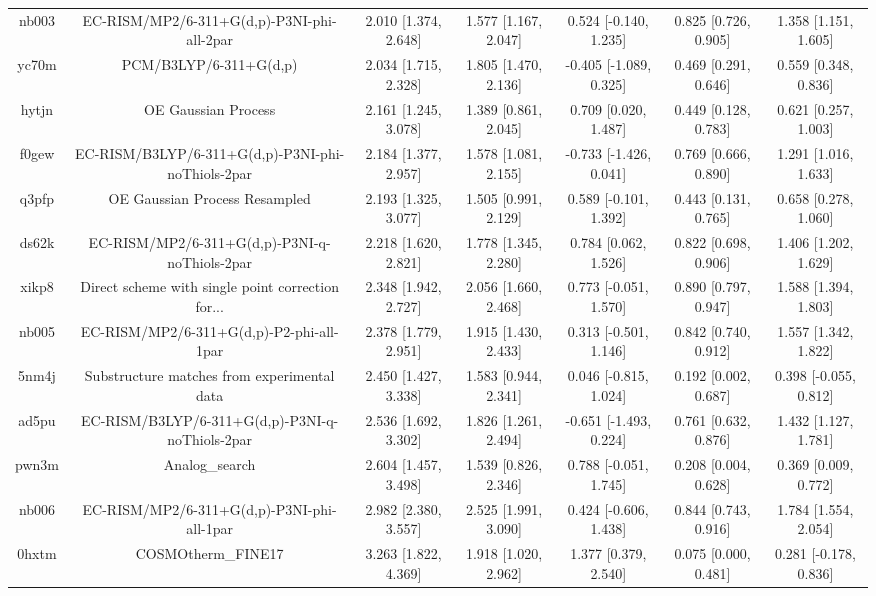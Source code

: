 \documentclass{article}
\begin{document}
\begin{center}
\begin{longtable}{|ccccccc|}
 nb003 &         EC-RISM/MP2/6-311+G(d,p)-P3NI-phi-all-2par &  2.010 [1.374, 2.648] &  1.577 [1.167, 2.047] &    0.524 [-0.140, 1.235] &  0.825 [0.726, 0.905] &   1.358 [1.151, 1.605] \\
 yc70m &                             PCM/B3LYP/6-311+G(d,p) &  2.034 [1.715, 2.328] &  1.805 [1.470, 2.136] &   -0.405 [-1.089, 0.325] &  0.469 [0.291, 0.646] &   0.559 [0.348, 0.836] \\
 hytjn &                                OE Gaussian Process &  2.161 [1.245, 3.078] &  1.389 [0.861, 2.045] &     0.709 [0.020, 1.487] &  0.449 [0.128, 0.783] &   0.621 [0.257, 1.003] \\
 f0gew &  EC-RISM/B3LYP/6-311+G(d,p)-P3NI-phi-noThiols-2par &  2.184 [1.377, 2.957] &  1.578 [1.081, 2.155] &   -0.733 [-1.426, 0.041] &  0.769 [0.666, 0.890] &   1.291 [1.016, 1.633] \\
 q3pfp &                      OE Gaussian Process Resampled &  2.193 [1.325, 3.077] &  1.505 [0.991, 2.129] &    0.589 [-0.101, 1.392] &  0.443 [0.131, 0.765] &   0.658 [0.278, 1.060] \\
 ds62k &      EC-RISM/MP2/6-311+G(d,p)-P3NI-q-noThiols-2par &  2.218 [1.620, 2.821] &  1.778 [1.345, 2.280] &     0.784 [0.062, 1.526] &  0.822 [0.698, 0.906] &   1.406 [1.202, 1.629] \\
 xikp8 &  Direct scheme with single point correction for... &  2.348 [1.942, 2.727] &  2.056 [1.660, 2.468] &    0.773 [-0.051, 1.570] &  0.890 [0.797, 0.947] &   1.588 [1.394, 1.803] \\
 nb005 &           EC-RISM/MP2/6-311+G(d,p)-P2-phi-all-1par &  2.378 [1.779, 2.951] &  1.915 [1.430, 2.433] &    0.313 [-0.501, 1.146] &  0.842 [0.740, 0.912] &   1.557 [1.342, 1.822] \\
 5nm4j &        Substructure matches from experimental data &  2.450 [1.427, 3.338] &  1.583 [0.944, 2.341] &    0.046 [-0.815, 1.024] &  0.192 [0.002, 0.687] &  0.398 [-0.055, 0.812] \\
 ad5pu &    EC-RISM/B3LYP/6-311+G(d,p)-P3NI-q-noThiols-2par &  2.536 [1.692, 3.302] &  1.826 [1.261, 2.494] &   -0.651 [-1.493, 0.224] &  0.761 [0.632, 0.876] &   1.432 [1.127, 1.781] \\
 pwn3m &                                     Analog\_search &  2.604 [1.457, 3.498] &  1.539 [0.826, 2.346] &    0.788 [-0.051, 1.745] &  0.208 [0.004, 0.628] &   0.369 [0.009, 0.772] \\
 nb006 &         EC-RISM/MP2/6-311+G(d,p)-P3NI-phi-all-1par &  2.982 [2.380, 3.557] &  2.525 [1.991, 3.090] &    0.424 [-0.606, 1.438] &  0.844 [0.743, 0.916] &   1.784 [1.554, 2.054] \\
 0hxtm &                                 COSMOtherm\_FINE17 &  3.263 [1.822, 4.369] &  1.918 [1.020, 2.962] &     1.377 [0.379, 2.540] &  0.075 [0.000, 0.481] &  0.281 [-0.178, 0.836] \\
\end{longtable}
\end{center}
\end{document}
